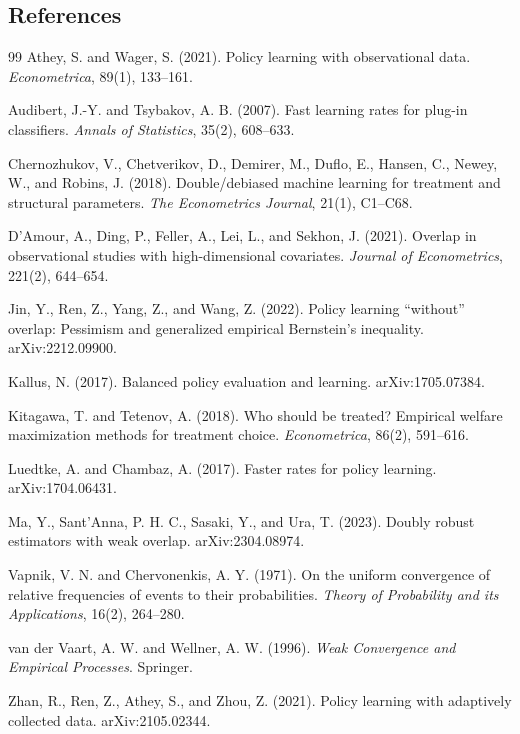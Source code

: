\documentclass[11pt]{article}
\theoremstyle{definition}
\theoremstyle{plain}
\theoremstyle{remark}
\begin{document}
\subsection*{References}
\begin{thebibliography}{99}
Athey, S. and Wager, S. (2021).
Policy learning with observational data.
\emph{Econometrica}, 89(1), 133--161.

Audibert, J.-Y. and Tsybakov, A. B. (2007).
Fast learning rates for plug-in classifiers.
\emph{Annals of Statistics}, 35(2), 608--633.

Chernozhukov, V., Chetverikov, D., Demirer, M., Duflo, E., Hansen, C.,
Newey, W., and Robins, J. (2018).
Double/debiased machine learning for treatment and structural parameters.
\emph{The Econometrics Journal}, 21(1), C1--C68.

D'Amour, A., Ding, P., Feller, A., Lei, L., and Sekhon, J. (2021).
Overlap in observational studies with high-dimensional covariates.
\emph{Journal of Econometrics}, 221(2), 644--654.

Jin, Y., Ren, Z., Yang, Z., and Wang, Z. (2022).
Policy learning ``without'' overlap: Pessimism and generalized empirical
Bernstein's inequality.
arXiv:2212.09900.

Kallus, N. (2017).
Balanced policy evaluation and learning.
arXiv:1705.07384.

Kitagawa, T. and Tetenov, A. (2018).
Who should be treated? Empirical welfare maximization methods for treatment
choice.
\emph{Econometrica}, 86(2), 591--616.

Luedtke, A. and Chambaz, A. (2017).
Faster rates for policy learning.
arXiv:1704.06431.

Ma, Y., Sant'Anna, P. H. C., Sasaki, Y., and Ura, T. (2023).
Doubly robust estimators with weak overlap.
arXiv:2304.08974.

Vapnik, V. N. and Chervonenkis, A. Y. (1971).
On the uniform convergence of relative frequencies of events to their
probabilities.
\emph{Theory of Probability and its Applications}, 16(2), 264--280.

van der Vaart, A. W. and Wellner, A. W. (1996).
\emph{Weak Convergence and Empirical Processes}.
Springer.

Zhan, R., Ren, Z., Athey, S., and Zhou, Z. (2021).
Policy learning with adaptively collected data.
arXiv:2105.02344.
\end{thebibliography}
\end{document}
